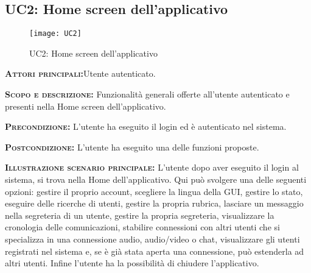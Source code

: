 \subsection{UC2: Home screen dell'applicativo}
\begin{figure}[h!]
\centering
\texttt{[image: UC2]}
\caption{UC2: Home screen dell'applicativo}\label{UC2}
\end{figure}
\begin{description}
\item{\scshape\bfseries Attori principali:}Utente autenticato.
\item{\scshape\bfseries Scopo e descrizione:} Funzionalità generali offerte all'utente autenticato e presenti nella Home screen dell'applicativo.
\item{\scshape\bfseries Precondizione:} L'utente ha eseguito il login ed è autenticato nel sistema.
\item{\scshape\bfseries Postcondizione:} L'utente ha eseguito una delle funzioni proposte.
\item{\scshape\bfseries Illustrazione scenario principale:} L'utente dopo aver eseguito il login al sistema, si trova nella Home dell'applicativo. Qui può svolgere una delle seguenti opzioni: gestire il proprio account, scegliere la lingua della GUI, gestire lo stato, eseguire delle ricerche di utenti, gestire la propria rubrica, lasciare un messaggio nella segreteria di un utente, gestire la propria segreteria, visualizzare la cronologia delle comunicazioni, stabilire connessioni con altri utenti che si specializza in una connessione audio, audio/video o chat, visualizzare gli utenti registrati nel sistema e, se è già stata aperta una connessione, può estenderla ad altri utenti. Infine l'utente ha la possibilità di chiudere l'applicativo.
\end{description}

